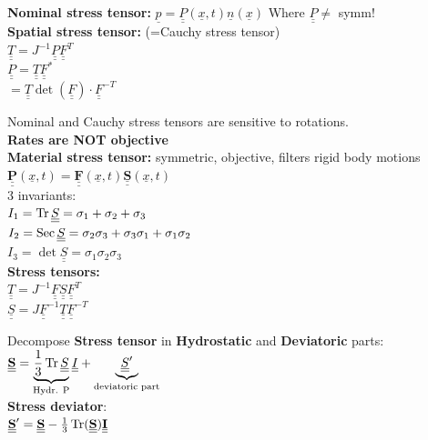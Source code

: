 \textbf{Nominal stress tensor:} $ \underline{p} = \underline{\underline{P}} (\underline{x},t) \underline{n}(\underline{x})$ Where $\underline{\underline{P}} \neq$ symm! \\

\textbf{Spatial stress tensor:} (=Cauchy stress tensor)\\
$ \underline{\underline{T}} = J^{-1} \underline{\underline{P}} \underline{\underline{F}}^T$ \\
$ \underline{\underline{P}} = \underline{\underline{T}} \underline{\underline{F}}^*$ \\
$ = \underline{\underline{T}} \det(\underline{\underline{F}}) \cdot \underline{\underline{F}}^{-T}$

Nominal and Cauchy stress tensors are sensitive to rotations. \\
\textbf{Rates are NOT objective} \\


\textbf{Material stress tensor:} symmetric, objective, filters rigid body motions \\
$ \underline{\underline{\mathbf{P}}}(\underline{x}, t) = \underline{\underline{\mathbf{F}}}(\underline{x}, t) \underline{\underline{\mathbf{S}}}(\underline{x}, t)$ \\
3 invariants: \\
$I_1 = \operatorname{Tr}{\underline{\underline{S}}} = \sigma_1 + \sigma_2 + \sigma_3$ \\
$I_2 = \operatorname{Sec}{\underline{\underline{S}}} = \sigma_{2}\sigma_3 + \sigma_3\sigma_1 + \sigma_1\sigma_2 $ \\
$I_3 = \det{\underline{\underline{S}}} = \sigma_1\sigma_2\sigma_3$\\

\textbf{Stress tensors:} \\
$\underline{\underline{T}} = J^{-1} \underline{\underline{F}} \underline{\underline{S}} \underline{\underline{F}}^T$ \\
$\underline{\underline{S}} = J \underline{\underline{F}}^{-1} \underline{\underline{T}} \underline{\underline{F}}^{-T}$

Decompose \textbf{Stress tensor} in \textbf{Hydrostatic} and \textbf{Deviatoric} parts: \\
$\underline{\underline{\mathbf{S}}} = \underbrace{\frac{1}{3} \operatorname{Tr}{\underline{\underline{S}}}}_{\text{Hydr. P}} \underline{\underline{I}} + \underbrace{\underline{\underline{S}}'}_{\text{deviatoric part}}$ \\

\textbf{Stress deviator}: \\
$\underline{\underline{\mathbf{S}}}' = \underline{\underline{\mathbf{S}}} - \frac{1}{3}\operatorname{Tr}({\underline{\underline{\mathbf{S}}}}) \underline{\underline{\mathbf{I}}}$ \\

